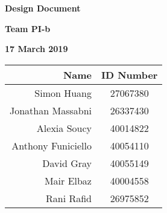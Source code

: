 \documentclass[12pt]{article}
\begin{document}
\thispagestyle{empty}
\vspace*{0.5in}
\centerline{\bf\Large Design Document}

\vspace*{0.5in}
\centerline{\bf\Large Team PI-b}

\vspace*{0.5in}
\centerline{\bf\Large 17 March 2019}

\vspace*{1.5in}
\begin{table}[htbp]
\begin{center}
\begin{tabular}{|r | c|}
\hline
Name & ID Number \\
\hline\hline
Simon Huang & 27067380 \\
\hline
Jonathan Massabni & 26337430 \\
\hline
Alexia Soucy & 40014822 \\
\hline
Anthony Funiciello& 40054110\\
\hline
David Gray&40055149\\
\hline
Mair Elbaz&40004558\\
\hline
Rani Rafid&26975852\\
\hline
\end{tabular}
\end{center}
\end{table}

\clearpage






\end{document}
